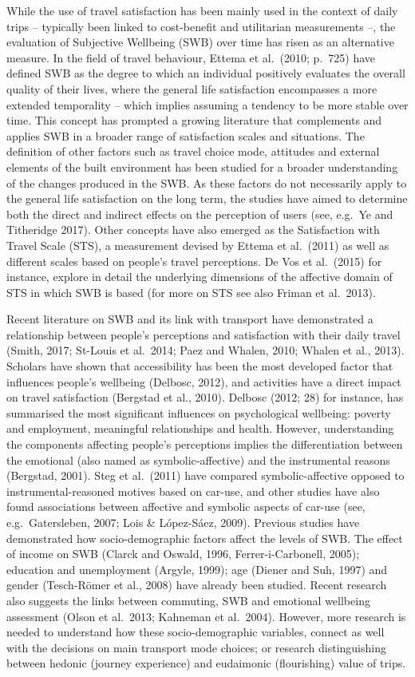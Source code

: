 \documentclass[]{elsarticle} %
\begin{document}
While the use of travel satisfaction has been mainly used in the context
of daily trips -- typically been linked to cost-benefit and utilitarian
measurements --, the evaluation of Subjective Wellbeing (SWB) over time
has risen as an alternative measure. In the field of travel behaviour,
Ettema et al.~(2010; p.~725) have defined SWB as the degree to which an
individual positively evaluates the overall quality of their lives,
where the general life satisfaction encompasses a more extended
temporality -- which implies assuming a tendency to be more stable over
time. This concept has prompted a growing literature that complements
and applies SWB in a broader range of satisfaction scales and
situations. The definition of other factors such as travel choice mode,
attitudes and external elements of the built environment has been
studied for a broader understanding of the changes produced in the SWB.
As these factors do not necessarily apply to the general life
satisfaction on the long term, the studies have aimed to determine both
the direct and indirect effects on the perception of users (see, e.g.~Ye
and Titheridge 2017). Other concepts have also emerged as the
Satisfaction with Travel Scale (STS), a measurement devised by Ettema et
al.~(2011) as well as different scales based on people's travel
perceptions. De Vos et al.~(2015) for instance, explore in detail the
underlying dimensions of the affective domain of STS in which SWB is
based (for more on STS see also Friman et al.~2013).

Recent literature on SWB and its link with transport have demonstrated a
relationship between people's perceptions and satisfaction with their
daily travel (Smith, 2017; St-Louis et al.~2014; Paez and Whalen, 2010;
Whalen et al., 2013). Scholars have shown that accessibility has been
the most developed factor that influences people's wellbeing (Delbosc,
2012), and activities have a direct impact on travel satisfaction
(Bergstad et al., 2010). Delbosc (2012; 28) for instance, has summarised
the most significant influences on psychological wellbeing: poverty and
employment, meaningful relationships and health. However, understanding
the components affecting people's perceptions implies the
differentiation between the emotional (also named as symbolic-affective)
and the instrumental reasons (Bergstad, 2001). Steg et al.~(2011) have
compared symbolic-affective opposed to instrumental-reasoned motives
based on car-use, and other studies have also found associations between
affective and symbolic aspects of car-use (see, e.g.~Gatersleben, 2007;
Lois \& López-Sáez, 2009). Previous studies have demonstrated how
socio-demographic factors affect the levels of SWB. The effect of income
on SWB (Clarck and Oswald, 1996, Ferrer-i-Carbonell, 2005); education
and unemployment (Argyle, 1999); age (Diener and Suh, 1997) and gender
(Tesch-Römer et al., 2008) have already been studied. Recent research
also suggests the links between commuting, SWB and emotional wellbeing
assessment (Olson et al.~2013; Kahneman et al.~2004). However, more
research is needed to understand how these socio-demographic variables,
connect as well with the decisions on main transport mode choices; or
research distinguishing between hedonic (journey experience) and
eudaimonic (flourishing) value of trips.
\end{document}
